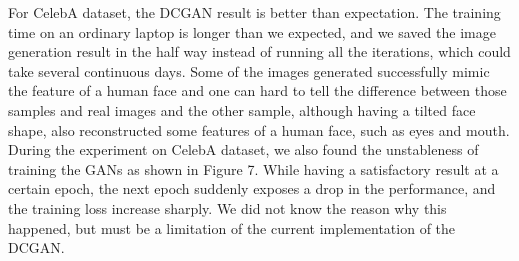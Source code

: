 \documentclass[10pt,twocolumn,letterpaper]{article}
\begin{document}
For CelebA dataset, the DCGAN result is better than expectation. The training time on an ordinary laptop is longer than we expected, and we saved the image generation result in the half way instead of running all the iterations, which could take several continuous days. Some of the images generated successfully mimic the feature of a human face and one can hard to tell the difference between those samples and real images and the other sample, although having a tilted face shape, also reconstructed some features of a human face, such as eyes and mouth.\\

During the experiment on CelebA dataset, we also found the unstableness of training the GANs as shown in Figure 7. While having a satisfactory result at a certain epoch, the next epoch suddenly exposes a drop in the performance, and the training loss increase sharply. We did not know the reason why this happened, but must be a limitation of the current implementation of the DCGAN.\\
\end{document}
